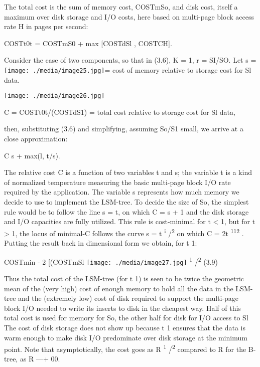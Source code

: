 \documentclass[a4paper,12pt,notitlepage,twoside,openright]{article}
\begin{document}
The total cost is the sum of memory cost, COSTmSo, and disk cost, itself
a maximum over disk storage and I/O costs, here based on multi-page
block access rate H in pages per second:

COSTt0t = COSTmS0 + max {[}COSTdSl , COSTCH{]}.

Consider the case of two components, so that in (3.6), K = 1, r = SI/SO.
Let s =
\texttt{[image: ./media/image25.jpg]}=
cost of memory relative to storage cost for Sl data.

\texttt{[image: ./media/image26.jpg]}

C = COSTt0t/(COSTdS1) = total cost relative to storage cost for Sl data,

then, substituting (3.6) and simplifying, assuming So/S1 small, we
arrive at a close approximation:

C s + max(l, t/s).

The relative cost C is a function of two variables t and s; the variable
t is a kind of normalized temperature measuring the basic multi-page
block I/O rate required by the application. The variable s represents
how much memory we decide to use to implement the LSM-tree. To decide
the size of So, the simplest rule would be to follow the line s = t, on
which C = s + 1 and the disk storage and I/O capacities are fully
utilized. This rule is cost-minimal for t \textless{} 1, but for t
\textgreater{} 1, the locus of minimal-C follows the curve s = t
\textsuperscript{i} /\textsuperscript{2} on which C = 2t
\textsuperscript{112} . Putting the result back in dimensional form we
obtain, for t 1:


COSTmin - 2 {[}(COSTmSl
\texttt{[image: ./media/image27.jpg]}
\textsuperscript{1} /\textsuperscript{2} (3.9)


Thus the total cost of the LSM-tree (for t 1) is seen to be twice the
geometric mean of the (very high) cost of enough memory to hold all the
data in the LSM-tree and the (extremely low) cost of disk required to
support the multi-page block I/O needed to write its inserts to disk in
the cheapest way. Half of this total cost is used for memory for So, the
other half for disk for I/O access to Sl The cost of disk storage does
not show up because t 1 ensures that the data is warm enough to make
disk I/O predominate over disk storage at the minimum point. Note that
asymptotically, the cost goes as R \textsuperscript{1}
/\textsuperscript{2} compared to R for the B-tree, as R ---+ 00.
\end{document}
